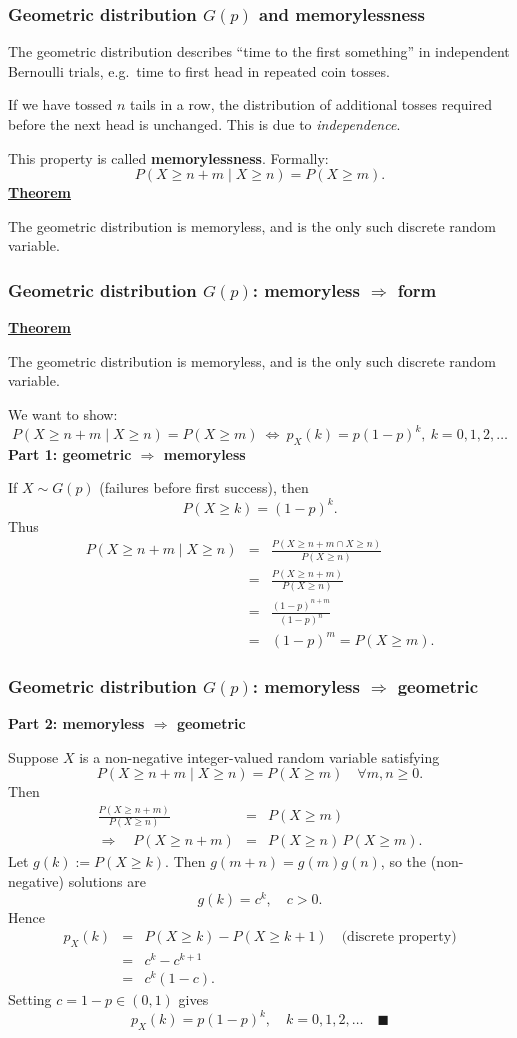 \documentclass[t,8pt]{beamer}
\begin{document}
\begin{frame}
	\frametitle{Geometric distribution $G(p)$ and memorylessness}
	The geometric distribution describes ``time to the first something'' in independent Bernoulli trials, e.g.\ time to first head in repeated coin tosses. \par
	If we have tossed $n$ tails in a row, the distribution of additional tosses required before the next head is unchanged. This is due to {\it independence}. \par
	This property is called {\bf memorylessness}. Formally:
	\[
	P(X\geq n+m\mid X\geq n)=P(X\geq m).
	\]
	{\bf\underline{Theorem}} \par
	The geometric distribution is memoryless, and is the only such discrete random variable.
\end{frame}

\begin{frame}
	\frametitle{Geometric distribution $G(p)$: memoryless $\Rightarrow$ form}
	{\bf\underline{Theorem}} \par
	The geometric distribution is memoryless, and is the only such discrete random variable. \par
	We want to show:
	\[
	P(X\geq n+m\mid X\geq n)=P(X\geq m)
	\ \Leftrightarrow\
	p_X(k)=p(1-p)^k,\ k=0,1,2,\dots
	\]
	{\bf Part 1: geometric $\Rightarrow$ memoryless} \par
	If $X\sim G(p)$ (failures before first success), then
	\[
	P(X\geq k)=(1-p)^k.
	\]
	Thus
	\begin{eqnarray*}
		P(X\geq n+m\mid X\geq n)
		&=&\frac{P(X\geq n+m\cap X\geq n)}{P(X\geq n)}\\
		&=&\frac{P(X\geq n+m)}{P(X\geq n)}\\
		&=&\frac{(1-p)^{n+m}}{(1-p)^n}\\
		&=&(1-p)^m
		=P(X\geq m).
	\end{eqnarray*}
\end{frame}

\begin{frame}
	\frametitle{Geometric distribution $G(p)$: memoryless $\Rightarrow$ geometric}
	{\bf Part 2: memoryless $\Rightarrow$ geometric} \par
	Suppose $X$ is a non-negative integer-valued random variable satisfying
	\[
	P(X\geq n+m\mid X\geq n)=P(X\geq m)\quad\forall m,n\ge0.
	\]
	Then
	\begin{eqnarray*}
		\frac{P(X\geq n+m)}{P(X\geq n)}
		&=&P(X\geq m)\\
		\Rightarrow\quad P(X\geq n+m)
		&=&P(X\geq n)\,P(X\geq m).
	\end{eqnarray*}
	Let $g(k):=P(X\geq k)$. Then $g(m+n)=g(m)g(n)$, so the (non-negative) solutions are
	\[
	g(k)=c^k,\quad c>0.
	\]
	Hence
	\begin{eqnarray*}
		p_X(k)
		&=&P(X\geq k)-P(X\geq k+1) \quad\text{(discrete property)}\\
		&=&c^{k}-c^{k+1}\\
		&=&c^{k}(1-c).
	\end{eqnarray*}
	Setting $c=1-p\in(0,1)$ gives
	\[
	p_X(k)=p(1-p)^{k},\quad k=0,1,2,\dots\quad\blacksquare
	\]
\end{frame}
\end{document}
